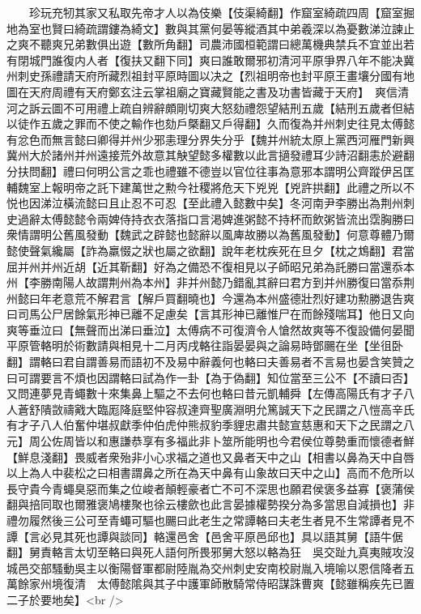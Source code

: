 　　珍玩充牣其家又私取先帝才人以為伎樂【伎渠綺翻】作窟室綺疏四周【窟室掘地為室也賢曰綺疏謂鏤為綺文】數與其黨何晏等縱酒其中弟羲深以為憂數涕泣諫止之爽不聽爽兄弟數俱出遊【數所角翻】司農沛國桓範謂曰總萬機典禁兵不宜並出若有閉城門誰復内人者【復扶又翻下同】爽曰誰敢爾邪初清河平原爭界八年不能决冀州刺史孫禮請天府所藏烈祖封平原時圖以决之【烈祖明帝也封平原王畫壤分國有地圖在天府周禮有天府鄭玄注云掌祖廟之寶藏賢能之書及功書皆藏于天府】　爽信清河之訴云圖不可用禮上疏自辨辭頗剛切爽大怒劾禮怨望結刑五歲【結刑五歲者但結以徒作五歲之罪而不使之輸作也劾戶槩翻又戶得翻】久而復為并州刺史往見太傅懿有忿色而無言懿曰卿得并州少邪恚理分界失分乎【魏并州統太原上黨西河雁門新興冀州大於諸州并州遠接荒外故意其觖望懿多權數以此言擿發禮耳少詩沼翻恚於避翻分扶問翻】禮曰何明公言之乖也禮雖不德豈以官位往事為意邪本謂明公齊蹤伊呂匡輔魏室上報明帝之託下建萬世之勲今社稷將危天下兇兇【兇許拱翻】此禮之所以不悦也因涕泣橫流懿曰且止忍不可忍【至此禮入懿數中矣】冬河南尹李勝出為荆州刺史過辭太傅懿懿令兩婢侍持衣衣落指口言渇婢進粥懿不持杯而飲粥皆流出霑胸勝曰衆情謂明公舊風發動【魏武之辟懿也懿辭以風庳故勝以為舊風發動】何意尊體乃爾懿使聲氣纔屬【詐為羸惙之狀也屬之欲翻】說年老枕疾死在旦夕【枕之鴆翻】君當屈并州并州近胡【近其靳翻】好為之備恐不復相見以子師昭兄弟為託勝曰當還忝本州【李勝南陽人故謂荆州為本州】非并州懿乃錯亂其辭曰君方到并州勝復曰當忝荆州懿曰年老意荒不解君言【解戶買翻曉也】今還為本州盛德壯烈好建功勲勝退告爽曰司馬公尸居餘氣形神已離不足慮矣【言其形神已離惟尸在而餘殘喘耳】他日又向爽等垂泣曰【無聲而出涕曰垂泣】太傅病不可復濟令人愴然故爽等不復設備何晏聞平原管輅明於術數請與相見十二月丙戌輅往詣晏晏與之論易時鄧颺在坐【坐徂卧翻】謂輅曰君自謂善易而語初不及易中辭義何也輅曰夫善易者不言易也晏含笑贊之曰可謂要言不煩也因謂輅曰試為作一卦【為于偽翻】知位當至三公不【不讀曰否】又問連夢見青蠅數十來集鼻上驅之不去何也輅曰昔元凱輔舜【左傳高陽氏有才子八人蒼舒隤敳禱戭大臨厖降庭堅仲容叔達齊聖廣淵明允篤誠天下之民謂之八愷高辛氏有才子八人伯奮仲堪叔獻季仲伯虎仲熊叔豹季貍忠肅共懿宣慈惠和天下之民謂之八元】周公佐周皆以和惠謙恭享有多福此非卜筮所能明也今君侯位尊勢重而懷德者鮮【鮮息淺翻】畏威者衆殆非小心求福之道也又鼻者天中之山【相書以鼻為天中自唇以上為人中裴松之曰相書謂鼻之所在為天中鼻有山象故曰天中之山】高而不危所以長守貴今青蠅臭惡而集之位峻者顛輕豪者亡不可不深思也願君侯褒多益寡【褒蒲侯翻與掊同取也爾雅褒鳩樓聚也徐云樓歛也此言晏據權勢揆分為多當思自減損也】非禮勿履然後三公可至青蠅可驅也颺曰此老生之常譚輅曰夫老生者見不生常譚者見不譚【言必見其死也譚與談同】輅還邑舍【邑舍平原邑邱也】具以語其舅【語牛倨翻】舅責輅言太切至輅曰與死人語何所畏邪舅大怒以輅為狂　吳交趾九真夷賊攻沒城邑交部騷動吳主以衡陽督軍都尉陸胤為交州刺史安南校尉胤入境喻以恩信降者五萬餘家州境復清　太傅懿隂與其子中護軍師散騎常侍昭謀誅曹爽【懿雖稱疾先已置二子於要地矣】<br />
